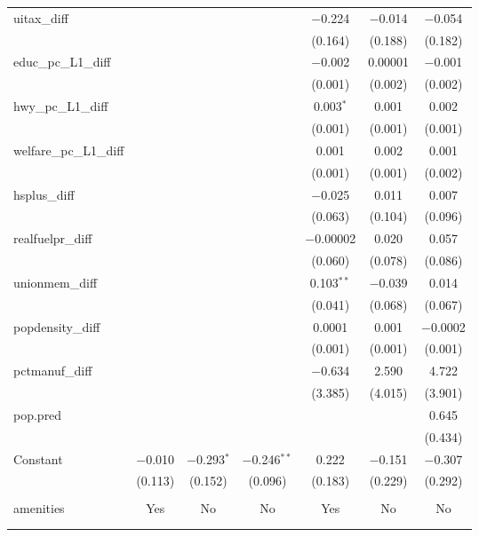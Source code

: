 \begin{table}[!htbp]
\begin{tabular}{@{\extracolsep{5pt}}lcccccc}
  uitax\_diff &  &  &  & $-$0.224 & $-$0.014 & $-$0.054 \\ 
  &  &  &  & (0.164) & (0.188) & (0.182) \\ 
  educ\_pc\_L1\_diff &  &  &  & $-$0.002 & 0.00001 & $-$0.001 \\ 
  &  &  &  & (0.001) & (0.002) & (0.002) \\ 
  hwy\_pc\_L1\_diff &  &  &  & 0.003$^{*}$ & 0.001 & 0.002 \\ 
  &  &  &  & (0.001) & (0.001) & (0.001) \\ 
  welfare\_pc\_L1\_diff &  &  &  & 0.001 & 0.002 & 0.001 \\ 
  &  &  &  & (0.001) & (0.001) & (0.002) \\ 
  hsplus\_diff &  &  &  & $-$0.025 & 0.011 & 0.007 \\ 
  &  &  &  & (0.063) & (0.104) & (0.096) \\ 
  realfuelpr\_diff &  &  &  & $-$0.00002 & 0.020 & 0.057 \\ 
  &  &  &  & (0.060) & (0.078) & (0.086) \\ 
  unionmem\_diff &  &  &  & 0.103$^{**}$ & $-$0.039 & 0.014 \\ 
  &  &  &  & (0.041) & (0.068) & (0.067) \\ 
  popdensity\_diff &  &  &  & 0.0001 & 0.001 & $-$0.0002 \\ 
  &  &  &  & (0.001) & (0.001) & (0.001) \\ 
  pctmanuf\_diff &  &  &  & $-$0.634 & 2.590 & 4.722 \\ 
  &  &  &  & (3.385) & (4.015) & (3.901) \\ 
  pop.pred &  &  &  &  &  & 0.645 \\ 
  &  &  &  &  &  & (0.434) \\ 
  Constant & $-$0.010 & $-$0.293$^{*}$ & $-$0.246$^{**}$ & 0.222 & $-$0.151 & $-$0.307 \\ 
  & (0.113) & (0.152) & (0.096) & (0.183) & (0.229) & (0.292) \\ 
 \hline \\[-1.8ex] 
amenities & Yes & No & No & Yes & No & No \\ 
\hline \\[-1.8ex] 
\hline 
\hline \\[-1.8ex] 
\end{tabular} 
\end{table} 
